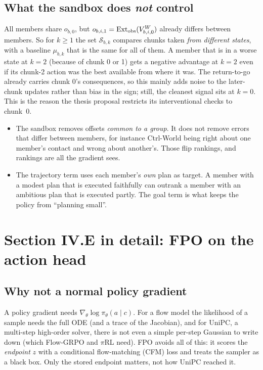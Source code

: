 \subsection{What the sandbox does \emph{not} control}
\begin{caveat}
All members share $o_{b,0}$, but $o_{b,i,1}=\mathrm{Ext}_{\mathrm{obs}}(V^{W}_{b,i,0})$ already differs between members. So for $k\ge1$ the set $\mathcal S_{b,k}$ compares chunks taken \emph{from different states}, with a baseline $\mu_{b,k}$ that is the same for all of them. A member that is in a worse state at $k=2$ (because of chunk 0 or 1) gets a negative advantage at $k=2$ even if its chunk-2 action was the best available from where it was. The return-to-go already carries chunk 0's consequences, so this mainly adds noise to the later-chunk updates rather than bias in the sign; still, the cleanest signal sits at $k=0$. This is the reason the thesis proposal restricts its interventional checks to chunk~0.
\end{caveat}
\begin{itemize}
\item The sandbox removes offsets \emph{common to a group}. It does not remove errors that differ between members, for instance Ctrl-World being right about one member's contact and wrong about another's. Those flip rankings, and rankings are all the gradient sees.
\item The trajectory term uses each member's \emph{own} plan as target. A member with a modest plan that is executed faithfully can outrank a member with an ambitious plan that is executed partly. The goal term is what keeps the policy from ``planning small''.
\end{itemize}

\section{Section IV.E in detail: FPO on the action head}

\subsection{Why not a normal policy gradient}
A policy gradient needs $\nabla_\theta\log\pi_\theta(a\mid c)$. For a flow model the likelihood of a sample needs the full ODE (and a trace of the Jacobian), and for UniPC, a multi-step high-order solver, there is not even a simple per-step Gaussian to write down (which Flow-GRPO and $\pi$RL need). FPO avoids all of this: it scores the \emph{endpoint} $z$ with a conditional flow-matching (CFM) loss and treats the sampler as a black box. Only the stored endpoint matters, not how UniPC reached it.


